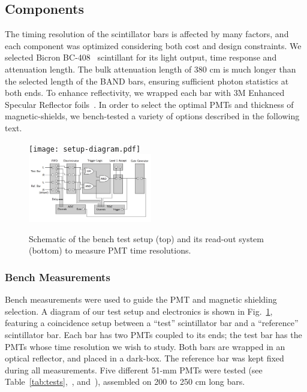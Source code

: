 \documentclass[3p,twocolumn]{elsarticle}
\begin{document}
\subsection{Components}
The timing resolution of the scintillator bars is affected by many
factors, and each component was optimized considering both cost and
 design constraints.
We selected Bicron BC-408~\cite{scint-mat-ref} scintillant for its
light output, time
response and attenuation length. The bulk attenuation length of 380
\si{\centi\meter} is much longer than the selected length of the BAND bars, ensuring sufficient
photon statistics at both ends. To enhance reflectivity, we wrapped
each bar with 3M Enhanced Specular Reflector foils~\cite{3MESR}. 
In order to select the optimal PMTs and thickness of magnetic-shields, we 
bench-tested a variety of options described in the following text.


\begin{figure}[tb]
	\centering
		\texttt{[image: setup-diagram.pdf]} \\
		\includegraphics[width=0.48\textwidth]{electr_setup.png}
	\caption{Schematic of the bench test setup (top) and its
          read-out system (bottom) to measure PMT time resolutions. }
	\label{fig:test_stand_setup}
\end{figure}

\subsubsection{Bench Measurements}

Bench measurements were used to guide the PMT and magnetic shielding
selection.  A diagram of our test setup and electronics is shown in
Fig.~\ref{fig:test_stand_setup}, featuring a coincidence setup between
a ``test'' scintillator bar and a ``reference'' scintillator bar.  Each
bar has two PMTs coupled to its ends; the test bar has the PMTs whose
time resolution we wish to study.  Both bars are wrapped in an optical
reflector, and placed in a dark-box.  The reference bar was kept fixed
during all measurements. Five different 51-\si{\milli\meter} PMTs were tested (see Table~\ref{tab:tests},~\cite{hamapmts}, and~\cite{pmt9214}), assembled on 200 to 250
\si{\centi\meter} long bars.
\end{document}
